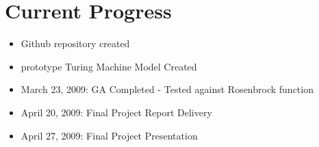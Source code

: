 \section{Current Progress} 
\begin{itemize}
	\item Github repository created
	\item prototype Turing Machine Model Created
\end{itemize}

\begin{itemize}
	\item March 23, 2009: GA Completed - Tested against Rosenbrock function
	\item April 20, 2009: Final Project Report Delivery
	\item April 27, 2009: Final Project Presentation
\end{itemize}